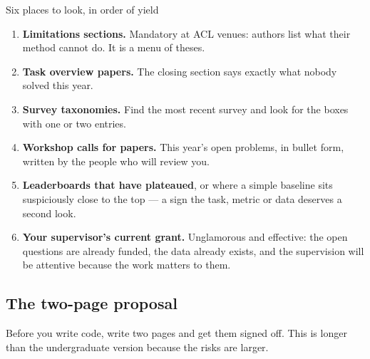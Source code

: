 \documentclass[11pt,a4paper]{article}
\begin{document}
\begin{cbox}{Six places to look, in order of yield}
\begin{enumerate}
  \item \textbf{Limitations sections.} Mandatory at ACL venues: authors list
        what their method cannot do. It is a menu of theses.
  \item \textbf{Task overview papers.} The closing section says exactly what
        nobody solved this year.
  \item \textbf{Survey taxonomies.} Find the most recent survey and look for
        the boxes with one or two entries.
  \item \textbf{Workshop calls for papers.} This year's open problems, in
        bullet form, written by the people who will review you.
  \item \textbf{Leaderboards that have plateaued}, or where a simple baseline
        sits suspiciously close to the top --- a sign the task, metric or data
        deserves a second look.
  \item \textbf{Your supervisor's current grant.} Unglamorous and effective:
        the open questions are already funded, the data already exists, and
        the supervision will be attentive because the work matters to them.
\end{enumerate}
\end{cbox}

\subsection{The two-page proposal}

Before you write code, write two pages and get them signed off. This is longer
than the undergraduate version because the risks are larger.
\end{document}
